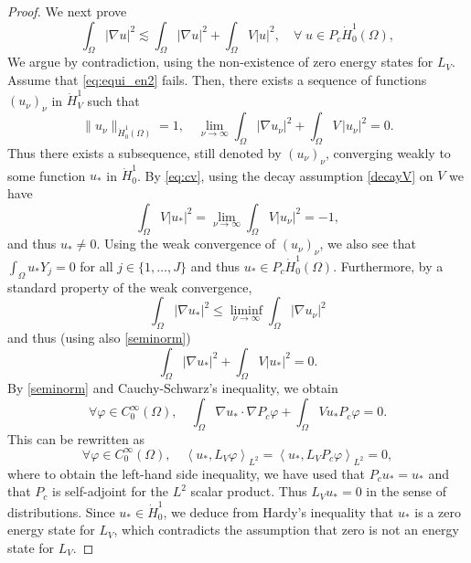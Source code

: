 \documentclass[10pt,leqno]{amsart}
\theoremstyle{definition}%
\theoremstyle{remark}
\numberwithin{equation}{section}
\renewcommand{\^}{\widehat}%
\begin{document}
\begin{proof}
	We next prove
	\begin{equation}
	\label{eq:equi_en2}
	\int_{\Omega}|\nabla u|^2\lesssim\int_{\Omega} |\nabla u|^2+\int_{\Omega} V |u|^2
	,\quad \forall \;u\in P_c\dot{H}^1_0(\Omega),
	\end{equation}
	We argue by contradiction, using the non-existence of zero energy states for $L_V$. Assume that \eqref{eq:equi_en2} fails.
	Then, there exists a sequence of functions $(u_\nu)_{\nu}$ in $\dot{H}^1_V$ such that 
	\begin{equation}
	\label{eq:cv}
	\|u_\nu\|_{\dot{H}^1_0(\Omega)}=1,\quad\lim_{\nu\to\infty}     \int_{\Omega}|\nabla u_{\nu}|^2+\int_{\Omega} V
	\,\lvert u_{\nu} \rvert^2=0.
	\end{equation}
	Thus there exists a subsequence, still denoted by $(u_\nu)_{\nu}$,  converging weakly to some function $u_*$ in $\dot{H}^1_0$. By \eqref{eq:cv}, using the decay assumption \eqref{decayV} on $V$ we have 
	$$\int_{\Omega}V|u_*|^2=\lim_{\nu\to\infty} \int_{\Omega} V|u_{\nu}|^2=-1,$$
	and thus $u_*\neq 0$. Using the weak convergence of $(u_{\nu})_{\nu}$, we also see that $\int_{\Omega} u_*Y_j=0$ for all $j\in \{1,\ldots,J\}$ and thus $u_*\in P_c\dot{H}^1_0(\Omega)$. Furthermore, by a standard property of the weak convergence, 
	$$ \int_{\Omega}|\nabla u_*|^2\leq \liminf_{\nu\to\infty} \int_{\Omega}|\nabla u_{\nu}|^2$$
	and thus (using also \eqref{seminorm})
	$$\int_{\Omega}|\nabla u_*|^2+\int_{\Omega}V|u_*|^2=0.$$
	By \eqref{seminorm} and Cauchy-Schwarz's inequality, we obtain 
	\begin{equation}
	\label{eq:OP}
	 \forall \varphi\in C_0^{\infty}(\Omega),\quad   \int_{\Omega}\nabla u_*\cdot\nabla P_c\varphi+\int_{\Omega}Vu_*P_c\varphi=0.
	\end{equation}
	This can be rewritten as
	$$ \forall \varphi\in C_0^{\infty}(\Omega),\quad   \left\langle u_*,L_V\varphi\right\rangle_{L^2}=\left\langle u_*,L_VP_c\varphi\right\rangle_{L^2}=0,$$
	where to obtain the left-hand side inequality, we have used that $P_cu_*=u_*$ and that $P_c$ is self-adjoint for the $L^2$ scalar product. Thus $L_Vu_*=0$ in the sense of distributions. Since $u_*\in \dot{H}^1_0$, we deduce from Hardy's inequality that $u_*$ is a zero energy state for $L_V$, which contradicts the assumption that zero is not an energy state for $L_V$.

\end{proof}
\end{document}
